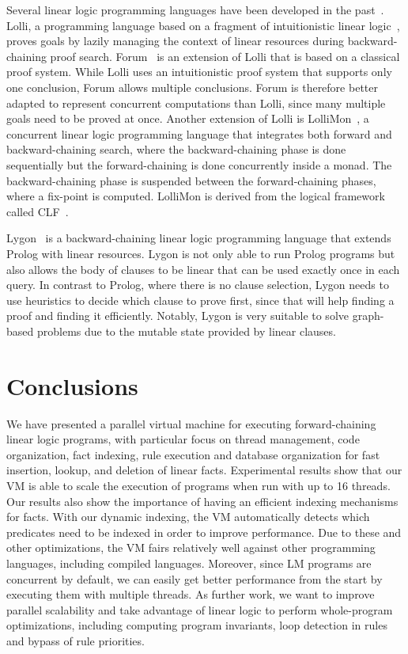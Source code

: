 \documentclass{sigplanconf}
\begin{document}
Several linear logic programming languages have been developed in the past~\cite{Miller85anoverview}.
Lolli, a programming language based on a fragment of intuitionistic linear logic~\cite{Hodas94logicprogramming}, 
proves goals by lazily managing the context of linear resources during backward-chaining proof search.
Forum~\cite{Miller94} is an extension of Lolli that is based on a classical proof system. While Lolli uses an intuitionistic proof system that supports only one conclusion, Forum allows multiple conclusions. Forum is therefore better adapted to represent concurrent computations than Lolli, since many multiple goals need to be proved at once.
Another extension of Lolli is LolliMon~\cite{Lopez:2005:MCL:1069774.1069778}, a concurrent linear logic programming language that integrates
both forward and backward-chaining search, where the backward-chaining phase is done sequentially but
the forward-chaining is done concurrently inside a monad. The backward-chaining phase is suspended
between the forward-chaining phases, where a fix-point is computed.
LolliMon is derived from the logical framework called CLF~\cite{Watkins:2004uq}.

Lygon~\cite{Harland96} is a backward-chaining linear logic programming language that extends Prolog with linear resources. Lygon is not only able to run Prolog programs but also allows the body of clauses to be linear that can be used exactly once in each query.
In contrast to Prolog, where there is no clause selection, Lygon needs to use heuristics to decide which clause to prove first, since that will help finding a proof and finding it efficiently. Notably, Lygon is very suitable to solve graph-based problems due to the mutable state provided by linear clauses.

\makeatletter{}\section{Conclusions}

We have presented a parallel virtual machine for executing
forward-chaining linear logic programs, with particular focus on
thread management, code organization, fact indexing, rule execution
and database organization for fast insertion, lookup, and deletion of
linear facts. Experimental results show that our VM is able to scale
the execution of programs when run with up to 16 threads.
Our results also show the importance of having an efficient indexing mechanisms
for facts. With our dynamic indexing, the VM automatically detects which predicates
need to be indexed in order to improve performance.
Due to these and other optimizations, the VM fairs relatively well against other programming languages, including
compiled languages. Moreover, since LM programs are
concurrent by default, we can easily get better performance from the
start by executing them with multiple threads.
As further work, we want to improve parallel scalability and
take advantage of linear logic to perform whole-program
optimizations, including computing program invariants, loop detection
in rules and bypass of rule priorities.
\end{document}
